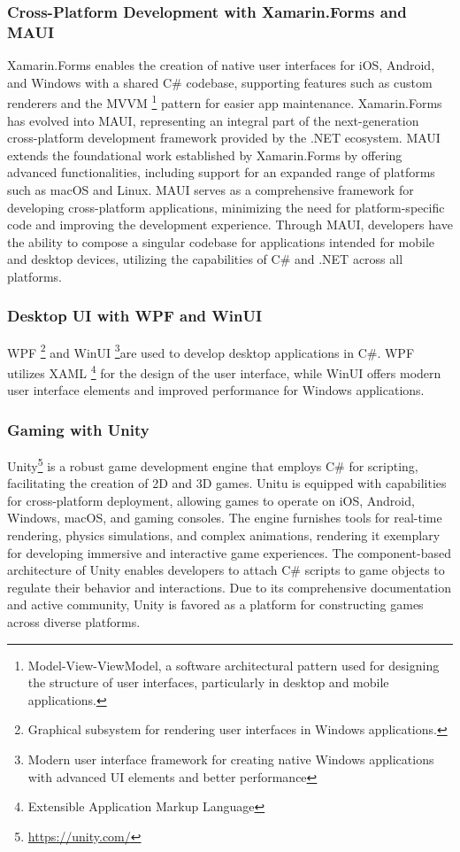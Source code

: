 \subsubsection{Cross-Platform Development with Xamarin.Forms and MAUI}  
Xamarin.Forms enables the creation of native user interfaces for iOS, Android, and Windows with a shared C\# codebase, supporting features such as custom renderers and the MVVM \footnote{Model-View-ViewModel, a software architectural pattern used for designing the structure of user interfaces, particularly in desktop and mobile applications.} pattern for easier app maintenance. 
Xamarin.Forms has evolved into \ac{MAUI}, representing an integral part of the next-generation cross-platform development framework provided by the .NET ecosystem. 
\ac{MAUI} extends the foundational work established by Xamarin.Forms by offering advanced functionalities, including support for an expanded range of platforms such as macOS and Linux. \ac{MAUI} serves as a comprehensive framework for developing cross-platform applications, minimizing the need for platform-specific code and improving the development experience. Through \ac{MAUI}, developers have the ability to compose a singular codebase for applications intended for mobile and desktop devices, utilizing the capabilities of C\# and .NET across all platforms.

\subsubsection{Desktop UI with WPF and WinUI}  
\ac{WPF} \footnote{Graphical subsystem for rendering user interfaces in Windows applications.} and \ac{WinUI} \footnote{Modern user interface framework for creating native Windows applications with advanced UI elements and better performance}are used to develop desktop applications in C\#. \ac{WPF} utilizes XAML \footnote{Extensible Application Markup Language} for the design of the user interface, while \ac{WinUI}  offers modern user interface elements and improved performance for Windows applications.

\subsubsection{Gaming with Unity}

Unity\footnote{\href{https://unity.com/}{https://unity.com/}} is a robust game development engine that employs C\# for scripting, facilitating the creation of 2D and 3D games. Unitu is equipped with capabilities for cross-platform deployment, allowing games to operate on iOS, Android, Windows, macOS, and gaming consoles. The engine furnishes tools for real-time rendering, physics simulations, and complex animations, rendering it exemplary for developing immersive and interactive game experiences. The component-based architecture of Unity enables developers to attach C\# scripts to game objects to regulate their behavior and interactions. Due to its comprehensive documentation and active community, Unity is favored as a platform for constructing games across diverse platforms.


